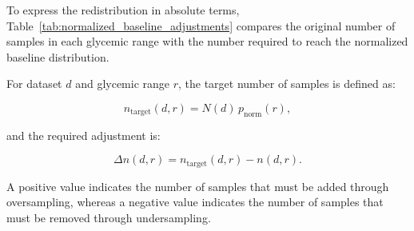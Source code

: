 To express the redistribution in absolute terms, Table~\ref{tab:normalized_baseline_adjustments} compares the original number of samples in each glycemic range with the number required to reach the normalized baseline distribution.

For dataset $d$ and glycemic range $r$, the target number of samples is defined as:

\[
n_{\mathrm{target}}(d,r)
=
N(d)\,p_{\mathrm{norm}}(r),
\]

and the required adjustment is:

\[
\Delta n(d,r)
=
n_{\mathrm{target}}(d,r)-n(d,r).
\]

A positive value indicates the number of samples that must be added through oversampling, whereas a negative value indicates the number of samples that must be removed through undersampling.

